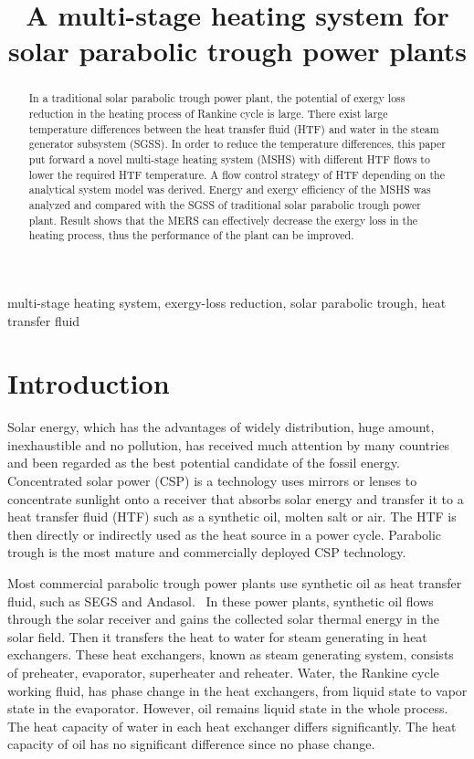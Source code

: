 \documentclass{article}
\begin{document}
\title{A multi-stage heating system for solar parabolic trough power plants}
\date{}
\author{}
\maketitle

\begin{abstract}
In a traditional solar parabolic trough power plant, the potential of exergy loss reduction in the heating process of Rankine cycle is large. There exist large temperature differences between the heat transfer fluid (HTF) and water in the steam generator subsystem (SGSS). In order to reduce the temperature differences, this paper put forward a novel multi-stage heating system (MSHS) with different HTF flows to lower the required HTF temperature. A flow control strategy of HTF depending on the analytical system model was derived. Energy and exergy efficiency of the MSHS was analyzed and compared with the SGSS of traditional solar parabolic trough power plant. Result shows that the MERS can effectively decrease the exergy loss in the heating process, thus the performance of the plant can be improved.
\end{abstract}

multi-stage heating system, exergy-loss reduction, solar parabolic trough, heat transfer fluid
\newpage{}

\linenumbers

\section{Introduction}

Solar energy, which has the advantages of widely distribution, huge amount, inexhaustible and no pollution, has received much attention by many countries and been regarded as the best potential candidate of the fossil energy.~\cite{Guo2016,Salgado2017}
Concentrated solar power (CSP) is a technology uses mirrors or lenses to concentrate sunlight onto a receiver that absorbs solar energy and transfer it to a heat transfer fluid (HTF) such as a synthetic oil, molten salt or air. The HTF is then directly or indirectly used as the heat source in a power cycle.
Parabolic trough is the most mature and commercially deployed CSP technology.

Most commercial parabolic trough power plants use synthetic oil as heat transfer fluid, such as SEGS and Andasol.~\cite{Price2002,Liu2016}
In these power plants, synthetic oil flows through the solar receiver and gains the collected solar thermal energy in the solar field.
Then it transfers the heat to water for steam generating in heat exchangers. These heat exchangers, known as steam generating system, consists of preheater, evaporator, superheater and reheater.
Water, the Rankine cycle working fluid, has phase change in the heat exchangers, from liquid state to vapor state in the evaporator.
However, oil remains liquid state in the whole process.
The heat capacity of water in each heat exchanger differs significantly. The heat capacity of oil has no significant difference since no phase change.
\end{document}
